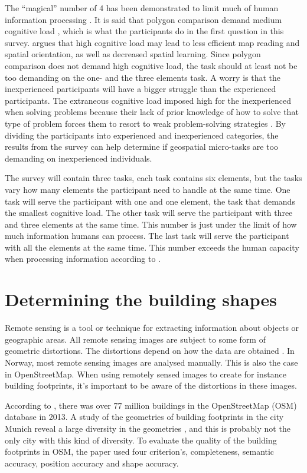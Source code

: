 The “magical” number of 4 has been demonstrated to limit much of human information processing \citep{Mandler2013}. It is said that polygon comparison demand medium cognitive load \citep{Kiefer2016}, which is what the participants do in the first question in this survey. \cite{Kiefer2016} argues that high cognitive load may lead to less efficient map reading and spatial orientation, as well as decreased spatial learning. Since polygon comparison does not demand high cognitive load, the task should at least not be too demanding on the one- and the three elements task. A worry is that the inexperienced participants will have a bigger struggle than the experienced participants. The extraneous cognitive load imposed high for the inexperienced when solving problems because their lack of prior knowledge of how to solve that type of problem forces them to resort to weak problem-solving strategies \citep{Leppink2014a}. By dividing the participants into experienced and inexperienced categories, the results from the survey can help determine if geospatial micro-tasks are too demanding on inexperienced individuals. 

The survey will contain three tasks, each task contains six elements, but the tasks vary how many elements the participant need to handle at the same time. One task will serve the participant with one and one element, the task that demands the smallest cognitive load. The other task will serve the participant with three and three elements at the same time. This number is just under the limit of how much information humans can process. The last task will serve the participant with all the elements at the same time. This number exceeds the human capacity when processing information according to \cite{Leppink2014a}. 

\section[Building shapes]{Determining the building shapes}
Remote sensing is a tool or technique for extracting information about objects or geographic areas. All remote sensing images are subject to some form of geometric distortions. The distortions depend on how the data are obtained \citep{Toutin2004}.  In Norway, most remote sensing images are analysed manually. This is also the case in OpenStreetMap. When using remotely sensed images to create for instance building footprints, it's important to be aware of the distortions in these images. 

According to \cite{Fan2014}, there was over 77 million buildings in the OpenStreetMap (OSM) database in 2013. A study of the geometries of building footprints in the city Munich reveal a large diversity in the geometries \citep{Fan2014}, and this is probably not the only city with this kind of diversity. To evaluate the quality of the building footprints in OSM, the \cite{Fan2014} paper used four criterion's, completeness, semantic accuracy, position accuracy and shape accuracy. 

